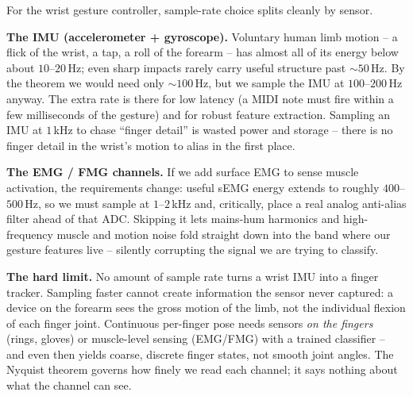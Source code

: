 \begin{goalbox}
For the wrist gesture controller, sample-rate choice splits cleanly by sensor.

\textbf{The IMU (accelerometer + gyroscope).} Voluntary human limb motion -- a flick of
the wrist, a tap, a roll of the forearm -- has almost all of its energy below about
$10$--$20$\,Hz; even sharp impacts rarely carry useful structure past $\sim 50$\,Hz. By
the theorem we would need only $\sim 100$\,Hz, but we sample the IMU at $100$--$200$\,Hz
anyway. The extra rate is there for low latency (a MIDI
note must fire within a few milliseconds of the gesture) and for robust feature
extraction. Sampling an IMU at $1$\,kHz to chase ``finger detail'' is wasted power and
storage -- there is no finger detail in the wrist's motion to alias in the first place.

\textbf{The EMG / FMG channels.} If we add surface EMG to sense muscle activation,
the requirements change: useful sEMG energy extends to roughly $400$--$500$\,Hz, so
we must sample at $1$--$2$\,kHz and, critically, place a real analog anti-alias filter
ahead of that ADC. Skipping it lets mains-hum harmonics and high-frequency muscle and
motion noise fold straight down into the band where our gesture features live --
silently corrupting the signal we are trying to classify.

\textbf{The hard limit.} No amount of sample rate turns a wrist IMU into a finger
tracker. Sampling faster cannot create information the sensor never captured: a device
on the forearm sees the gross motion of the limb, not the individual flexion of each
finger joint. Continuous per-finger pose needs sensors \emph{on the fingers} (rings,
gloves) or muscle-level sensing (EMG/FMG) with a trained classifier -- and even then
yields coarse, discrete finger states, not smooth joint angles. The Nyquist theorem
governs how finely we read each channel; it says nothing about what the channel can see.
\end{goalbox}

